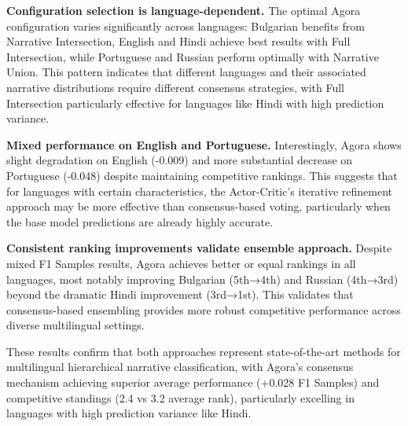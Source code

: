 \textbf{Configuration selection is language-dependent.} The optimal Agora configuration varies significantly across languages: Bulgarian benefits from Narrative Intersection, English and Hindi achieve best results with Full Intersection, while Portuguese and Russian perform optimally with Narrative Union. This pattern indicates that different languages and their associated narrative distributions require different consensus strategies, with Full Intersection particularly effective for languages like Hindi with high prediction variance.

\textbf{Mixed performance on English and Portuguese.} Interestingly, Agora shows slight degradation on English (-0.009) and more substantial decrease on Portuguese (-0.048) despite maintaining competitive rankings. This suggests that for languages with certain characteristics, the Actor-Critic's iterative refinement approach may be more effective than consensus-based voting, particularly when the base model predictions are already highly accurate.

\textbf{Consistent ranking improvements validate ensemble approach.} Despite mixed F1 Samples results, Agora achieves better or equal rankings in all languages, most notably improving Bulgarian (5th→4th) and Russian (4th→3rd) beyond the dramatic Hindi improvement (3rd→1st). This validates that consensus-based ensembling provides more robust competitive performance across diverse multilingual settings.

These results confirm that both approaches represent state-of-the-art methods for multilingual hierarchical narrative classification, with Agora's consensus mechanism achieving superior average performance (+0.028 F1 Samples) and competitive standings (2.4 vs 3.2 average rank), particularly excelling in languages with high prediction variance like Hindi.


